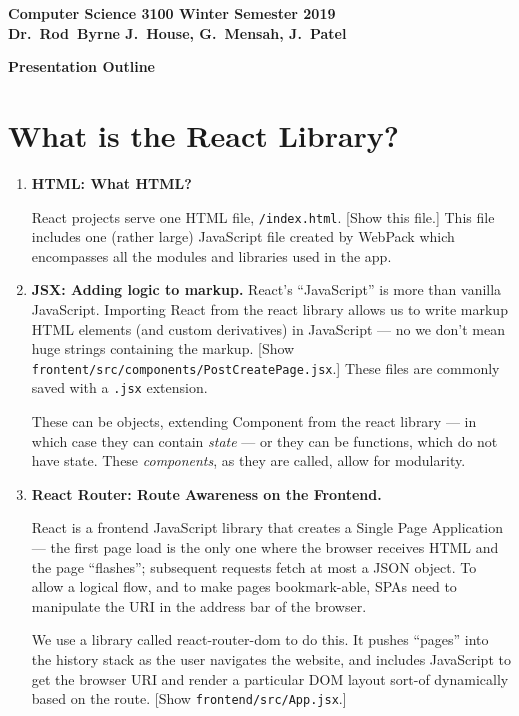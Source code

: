 \documentclass[12pt]{article}
\begin{document}
{
	\parindent=0pt
	\bfseries 
	Computer Science 3100 \hfill Winter Semester 2019 \\
	Dr.~Rod~Byrne \hfill J.~House, G.~Mensah, J.~Patel\\
}

\vskip 1pc

\begin{center}
	\LARGE\bfseries Presentation Outline
\end{center}

\section{What is the {\sffamily React} Library?}
\begin{enumerate}[label={(\arabic*)}]
	\item {\bfseries HTML: What HTML?}

		{\sffamily React} projects serve one HTML file, \verb|/index.html|. [Show this file.] This file includes one (rather large) JavaScript file created by WebPack which encompasses all the modules and libraries used in the app. 

	\item {\bfseries JSX: Adding logic to markup.}
		React's ``JavaScript'' is more than vanilla JavaScript. Importing {\ttfamily React} from the {\ttfamily react} library allows us to write markup HTML elements (and custom derivatives) in JavaScript --- no we don't mean huge strings containing the markup. [Show \verb|frontent/src/components/PostCreatePage.jsx|.] These files are commonly saved with a \verb|.jsx| extension.

		These can be objects, extending {\ttfamily Component} from the {\ttfamily react} library --- in which case they can contain {\em state} --- or they can be functions, which do not have state. These {\em components}, as they are called, allow for modularity.

	\item {\bfseries {\sffamily React} Router: Route Awareness on the Frontend.}

		{\sffamily React} is a frontend JavaScript library that creates a Single Page Application --- the first page load is the only one where the browser receives HTML and the page ``flashes''; subsequent requests fetch at most a JSON object. To allow a logical flow, and to make pages bookmark-able, SPAs need to manipulate the URI in the address bar of the browser.

		We use a library called {\ttfamily react-router-dom} to do this. It pushes ``pages'' into the history stack as the user navigates the website, and includes JavaScript to get the browser URI and render a particular DOM layout sort-of dynamically based on the route. [Show \verb|frontend/src/App.jsx|.]
\end{enumerate}
\end{document}
